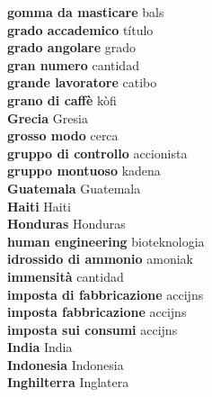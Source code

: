 \textbf{ gomma da masticare  } bals \\
\textbf{ grado accademico  } título \\
\textbf{ grado angolare  } grado \\
\textbf{ gran numero  } cantidad \\
\textbf{ grande lavoratore  } catibo \\
\textbf{ grano di caffè  } kòfi \\
\textbf{ Grecia  } Gresia \\
\textbf{ grosso modo  } cerca \\
\textbf{ gruppo di controllo  } accionista \\
\textbf{ gruppo montuoso  } kadena \\
\textbf{ Guatemala  } Guatemala \\
\textbf{ Haiti  } Haiti \\
\textbf{ Honduras  } Honduras \\
\textbf{ human engineering  } bioteknologia \\
\textbf{ idrossido di ammonio  } amoniak \\
\textbf{ immensità  } cantidad \\
\textbf{ imposta di fabbricazione  } accijns \\
\textbf{ imposta fabbricazione  } accijns \\
\textbf{ imposta sui consumi  } accijns \\
\textbf{ India  } India \\
\textbf{ Indonesia  } Indonesia \\
\textbf{ Inghilterra  } Inglatera \\

